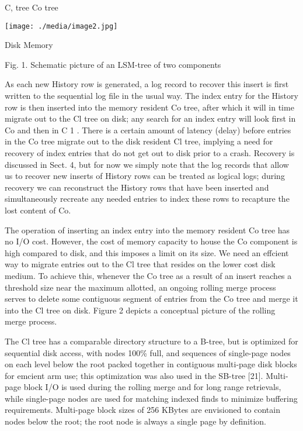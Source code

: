 \documentclass[a4paper,11pt,notitlepage,twoside,openright]{article}
\begin{document}
C, tree Co tree


\texttt{[image: ./media/image2.jpg]}


Disk Memory


Fig. 1. Schematic picture of an LSM-tree of two components

As each new History row is generated, a log record to recover this
insert is first written to the sequential log file in the usual way. The
index entry for the History row is then inserted into the memory
resident Co tree, after which it will in time migrate out to the Cl tree
on disk; any search for an index entry will look first in Co and then in
C 1 . There is a certain amount of latency (delay) before entries in the
Co tree migrate out to the disk resident Cl tree, implying a need for
recovery of index entries that do not get out to disk prior to a crash.
Recovery is discussed in Sect. 4, but for now we simply note that the
log records that allow us to recover new inserts of History rows can be
treated as logical logs; during recovery we can reconstruct the History
rows that have been inserted and simultaneously recreate any needed
entries to index these rows to recapture the lost content of Co.

The operation of inserting an index entry into the memory resident Co
tree has no I/O cost. However, the cost of memory capacity to house the
Co component is high compared to disk, and this imposes a limit on its
size. We need an effcient way to migrate entries out to the Cl tree that
resides on the lower cost disk medium. To achieve this, whenever the Co
tree as a result of an insert reaches a threshold size near the maximum
allotted, an ongoing rolling merge process serves to delete some
contiguous segment of entries from the Co tree and merge it into the Cl
tree on disk. Figure 2 depicts a conceptual picture of the rolling merge
process.

The Cl tree has a comparable directory structure to a B-tree, but is
optimized for sequential disk access, with nodes 100\% full, and
sequences of single-page nodes on each level below the root packed
together in contiguous multi-page disk blocks for emcient arm use; this
optimization was also used in the SB-tree {[}21{]}. Multi-page block I/O
is used during the rolling merge and for long range retrievals, while
single-page nodes are used for matching indexed finds to minimize
buffering requirements. Multi-page block sizes of 256 KBytes are
envisioned to contain nodes below the root; the root node is always a
single page by definition.
\end{document}
